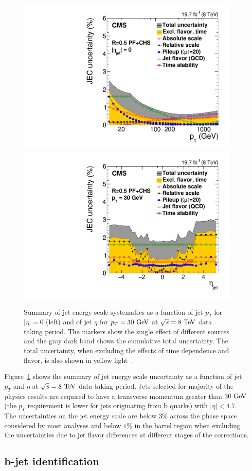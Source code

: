 \begin{figure}[h]
\centering
\includegraphics[width=0.49\columnwidth]{figures_chapter4/jec_unc}
\includegraphics[width=0.49\columnwidth]{figures_chapter4/jec_unc2}
\caption{Summary of jet energy scale systematics as a function of jet $p_{T}$ for $|\eta|=0$ (left) and of jet $\eta$ for $p_{T}=30~\mathrm{Ge\kern -0.1em V}$ at $\sqrt{s}=8~\mathrm{Te\kern -0.1em V}$ data taking period. The markers show the single effect of different sources and the gray dark band shows the cumulative total uncertainty. The total uncertainty, when excluding the effects of time dependence and flavor, is also shown in yellow light~\cite{Khachatryan:2016kdb}.}
\label{fig:jet_unc}
\end{figure}

Figure~\ref{fig:jet_unc} shows the summary of jet energy scale uncertainty as a function of jet $p_{T}$ and $\eta$ at $\sqrt{s}=8~\mathrm{Te\kern -0.1em V}$ data taking period. Jets selected for majority of the physics results are required to have a transverse momentum greater than $30~\mathrm{Ge\kern -0.1em V}$ (the $p_{T}$ requirement is lower for jets originating from b quarks) with $|\eta|<4.7$.  The uncertainties on the jet energy scale are below $3\%$ across the phase space considered by most analyses and below $1\%$ in the barrel region when excluding the uncertainties due to jet flavor differences at different stages of the corrections.

\subsection{b-jet identification}



